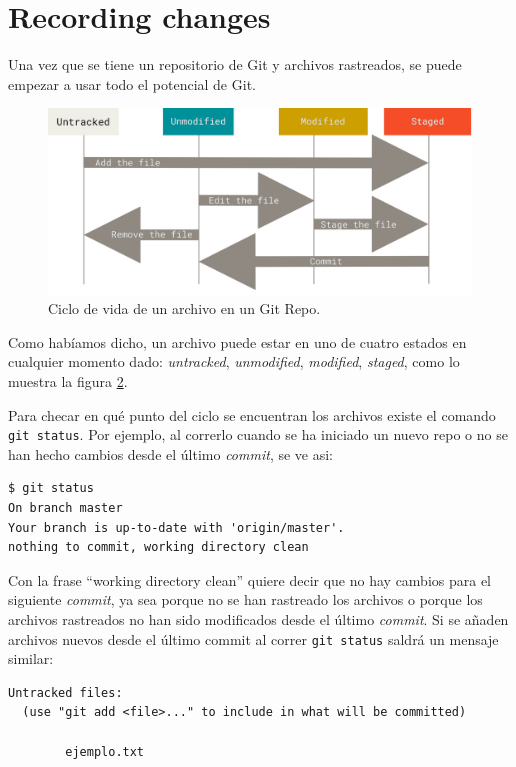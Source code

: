 \documentclass[spanish, 12pt, a4paper]{article}
\begin{document}
\section{Recording changes}

Una vez que se tiene un repositorio de Git y archivos rastreados, se
puede empezar a usar todo el potencial de Git.

\begin{figure}
\centering
\includegraphics{figs/lifecycle.png}
\caption{Ciclo de vida de un archivo en un Git Repo.{}}
\end{figure}

Como habíamos dicho, un archivo puede estar en uno de cuatro estados en
cualquier momento dado: \emph{untracked}, \emph{unmodified},
\emph{modified}, \emph{staged}, como lo muestra la figura
\protect\hyperlink{fig:lifecycle}{2}.

Para checar en qué punto del ciclo se encuentran los archivos existe el
comando \passthrough{\lstinline!git status!}. Por ejemplo, al correrlo
cuando se ha iniciado un nuevo repo o no se han hecho cambios desde el
último \emph{commit}, se ve asi:

\begin{lstlisting}
$ git status
On branch master
Your branch is up-to-date with 'origin/master'.
nothing to commit, working directory clean
\end{lstlisting}

Con la frase ``working directory clean'' quiere decir que no hay cambios
para el siguiente \emph{commit}, ya sea porque no se han rastreado los
archivos o porque los archivos rastreados no han sido modificados desde
el último \emph{commit}. Si se añaden archivos nuevos desde el último
commit al correr \passthrough{\lstinline!git status!} saldrá un mensaje
similar:

\begin{lstlisting}
Untracked files:
  (use "git add <file>..." to include in what will be committed)

        ejemplo.txt
\end{lstlisting}
\end{document}
